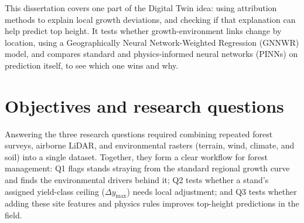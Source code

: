 \documentclass[logo,msc,ai]{infthesis}           %
\begin{document}
This dissertation covers one part of the Digital Twin idea: using attribution methods to explain local growth deviations, and checking if that explanation can help predict top height. It tests whether growth-environment links change by location, using a Geographically Neural Network-Weighted Regression (GNNWR) model, and compares standard and physics-informed neural networks (PINNs) on prediction itself, to see which one wins and why.

\section{Objectives and research questions}
Answering the three research questions required combining repeated forest surveys, airborne LiDAR, and environmental rasters (terrain, wind, climate, and soil) into a single dataset. Together, they form a clear workflow for forest management: Q1 flags stands straying from the standard regional growth curve and finds the environmental drivers behind it; Q2 tests whether a stand's assigned yield-class ceiling ($\Delta y_{\max}$) needs local adjustment; and Q3 tests whether adding these site features and physics rules improves top-height predictions in the field.
\end{document}
